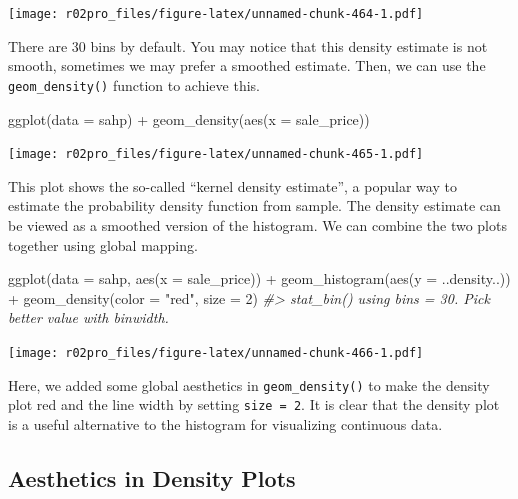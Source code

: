 \documentclass[
]{book}
\newenvironment{Shaded}{\begin{snugshade}}{\end{snugshade}}
\newcommand{\AttributeTok}[1]{\textcolor[rgb]{0.77,0.63,0.00}{#1}}
\newcommand{\CommentTok}[1]{\textcolor[rgb]{0.56,0.35,0.01}{\textit{#1}}}
\newcommand{\DecValTok}[1]{\textcolor[rgb]{0.00,0.00,0.81}{#1}}
\newcommand{\FunctionTok}[1]{\textcolor[rgb]{0.00,0.00,0.00}{#1}}
\newcommand{\NormalTok}[1]{#1}
\newcommand{\SpecialCharTok}[1]{\textcolor[rgb]{0.00,0.00,0.00}{#1}}
\newcommand{\StringTok}[1]{\textcolor[rgb]{0.31,0.60,0.02}{#1}}
\begin{document}
\texttt{[image: r02pro\_files/figure-latex/unnamed-chunk-464-1.pdf]}

There are 30 bins by default. You may notice that this density estimate is not smooth, sometimes we may prefer a smoothed estimate. Then, we can use the \texttt{geom\_density()} function to achieve this.

\begin{Shaded}
\begin{Highlighting}[]
\FunctionTok{ggplot}\NormalTok{(}\AttributeTok{data =}\NormalTok{ sahp) }\SpecialCharTok{+} \FunctionTok{geom\_density}\NormalTok{(}\FunctionTok{aes}\NormalTok{(}\AttributeTok{x =}\NormalTok{ sale\_price))}
\end{Highlighting}
\end{Shaded}

\texttt{[image: r02pro\_files/figure-latex/unnamed-chunk-465-1.pdf]}

This plot shows the so-called ``kernel density estimate'', a popular way to estimate the probability density function from sample. The density estimate can be viewed as a smoothed version of the histogram. We can combine the two plots together using global mapping.

\begin{Shaded}
\begin{Highlighting}[]
\FunctionTok{ggplot}\NormalTok{(}\AttributeTok{data =}\NormalTok{ sahp, }\FunctionTok{aes}\NormalTok{(}\AttributeTok{x =}\NormalTok{ sale\_price)) }\SpecialCharTok{+}
  \FunctionTok{geom\_histogram}\NormalTok{(}\FunctionTok{aes}\NormalTok{(}\AttributeTok{y =}\NormalTok{ ..density..)) }\SpecialCharTok{+}
  \FunctionTok{geom\_density}\NormalTok{(}\AttributeTok{color =} \StringTok{"red"}\NormalTok{, }\AttributeTok{size =} \DecValTok{2}\NormalTok{)}
\CommentTok{\#\textgreater{} \textasciigrave{}stat\_bin()\textasciigrave{} using \textasciigrave{}bins = 30\textasciigrave{}. Pick better value with \textasciigrave{}binwidth\textasciigrave{}.}
\end{Highlighting}
\end{Shaded}

\texttt{[image: r02pro\_files/figure-latex/unnamed-chunk-466-1.pdf]}

Here, we added some global aesthetics in \texttt{geom\_density()} to make the density plot red and the line width by setting \texttt{size\ =\ 2}. It is clear that the density plot is a useful alternative to the histogram for visualizing continuous data.

\hypertarget{aesthetics-in-density-plots}{%
\subsection{Aesthetics in Density Plots}\label{aesthetics-in-density-plots}}
\end{document}
